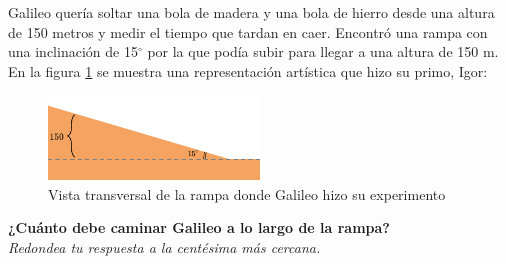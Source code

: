 \question[15] Galileo quería soltar una bola de madera y una bola de hierro desde una altura de 150 metros y medir el tiempo que tardan en caer.
Encontró una rampa con una inclinación de 15$^\circ$ por la que podía subir para llegar a una altura de 150 m.
En la figura \ref{fig:igor} se muestra una representación art\'istica que hizo su primo, Igor:
\begin{figure}[H]
    \begin{center}
        \includegraphics[width=0.5\textwidth]{../images/igor.png}
    \end{center}
    \caption{Vista transversal de la rampa donde Galileo hizo su experimento}
    \label{fig:igor}
\end{figure}
\textbf{¿Cuánto debe caminar Galileo a lo largo de la rampa?}\\
\textit{Redondea tu respuesta a la centésima más cercana.}